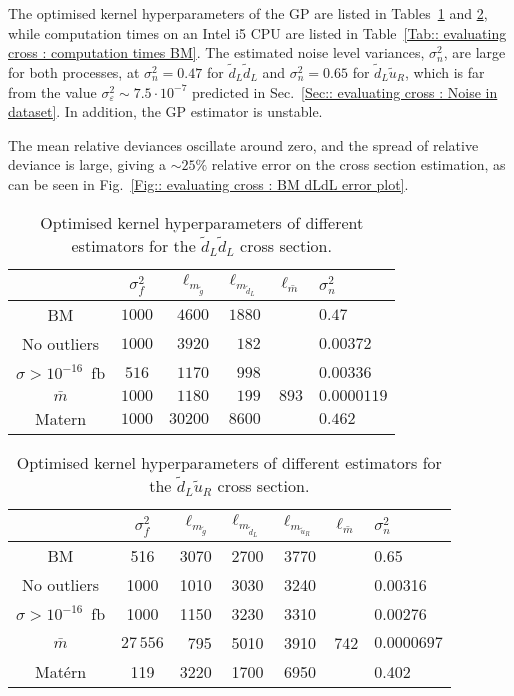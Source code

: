 \documentclass[twoside,english]{uiofysmaster}
\begin{document}
{{The optimised kernel hyperparameters of the GP are listed in Tables~\ref{Tab:: evaluating cross : optimal kernels dLdL} and \ref{Tab:: evaluating cross : optimal kernels dLuR}, while computation times on an Intel i5 CPU are listed in Table~\ref{Tab:: evaluating cross : computation times BM}. The estimated noise level variances, $\sigma_n^2$, are large for both processes, at $\sigma_n^2=0.47$ for $\widetilde{d}_L \widetilde{d}_L$ and $\sigma_n^2=0.65$ for $\widetilde{d}_L \widetilde{u}_R$, which is far from the value $\sigma_{\varepsilon}^2 \sim 7.5 \cdot 10^{-7}$ predicted in Sec.~\ref{Sec:: evaluating cross : Noise in dataset}. In addition, the GP estimator is unstable. 

The mean relative deviances oscillate around zero, and the spread of relative deviance is large, giving a $\sim 25 \%$ relative error on the cross section estimation, as can be seen in Fig.~\ref{Fig:: evaluating cross : BM dLdL error plot}.

\begin{table}
\centering
\begin{tabular}{@{}ccrrrl@{}} \toprule
 & $\sigma_f^2$ & $\ell_{m_{\widetilde{g}}}$ & $\ell_{m_{\widetilde{d}_L}}$ & $\ell_{\bar{m}}$ & $\sigma_n^2$\\ \midrule
BM & $1000$ & $4600 $& $ 1880$ & & $0.47$\\
No outliers & $1000$ & $3920$ & $182$ & & $0.00372$\\
$\sigma > 10^{-16}$~fb & $516$ & $1170$&  $998$ && $0.00336$\\
$\bar{m}$ & $1000$ & $1180$ & $199$ & $893$ & $0.0000119$\\
Matern & $1000$ & $30200$ & $8600$ && $0.462$\\ \bottomrule
\end{tabular}
\caption{Optimised kernel hyperparameters of different estimators for the $\widetilde{d}_L \widetilde{d}_L$ cross section.}
\label{Tab:: evaluating cross : optimal kernels dLdL}
\end{table}


\begin{table}
\centering
\begin{tabular}{@{}ccrrrrl@{}} \toprule
 & $\sigma_f^2$ & $\ell_{m_{\widetilde{g}}}$ & $\ell_{m_{\widetilde{d}_L}}$ & $\ell_{m_{\widetilde{u}_R}}$ & $\ell_{\bar{m}}$ &$\sigma_n^2$\\ \midrule
BM & 516 & 3070 & 2700 & 3770 && 0.65 \\
No outliers &  1000 & 1010 & 3030 & 3240&& 0.00316\\ 
$\sigma > 10^{-16}$~fb & 1000 &1150  & 3230& 3310&& 0.00276 \\
$\bar{m}$ & $27\,556$ & 795&5010 &3910 & 742 & $0.0000697$\\
Mat\'{e}rn & 119 & 3220  &1700 & 6950 && 0.402\\ \bottomrule
\end{tabular}
\caption{Optimised kernel hyperparameters of different estimators for the $\widetilde{d}_L \widetilde{u}_R$ cross section.}
\label{Tab:: evaluating cross : optimal kernels dLuR}
\end{table}
 
}}
\end{document}
